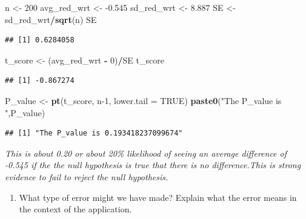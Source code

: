 \documentclass[]{article}
\newenvironment{Shaded}{\begin{snugshade}}{\end{snugshade}}
\newcommand{\DataTypeTok}[1]{\textcolor[rgb]{0.13,0.29,0.53}{#1}}
\newcommand{\DecValTok}[1]{\textcolor[rgb]{0.00,0.00,0.81}{#1}}
\newcommand{\FloatTok}[1]{\textcolor[rgb]{0.00,0.00,0.81}{#1}}
\newcommand{\KeywordTok}[1]{\textcolor[rgb]{0.13,0.29,0.53}{\textbf{#1}}}
\newcommand{\NormalTok}[1]{#1}
\newcommand{\OperatorTok}[1]{\textcolor[rgb]{0.81,0.36,0.00}{\textbf{#1}}}
\newcommand{\OtherTok}[1]{\textcolor[rgb]{0.56,0.35,0.01}{#1}}
\newcommand{\StringTok}[1]{\textcolor[rgb]{0.31,0.60,0.02}{#1}}
\providecommand{\tightlist}{%
  \setlength{\itemsep}{0pt}\setlength{\parskip}{0pt}}
\begin{document}
\begin{Shaded}
\begin{Highlighting}[]
\NormalTok{n <-}\StringTok{ }\DecValTok{200}
\NormalTok{avg_red_wrt <-}\StringTok{ }\FloatTok{-0.545}
\NormalTok{sd_red_wrt <-}\StringTok{ }\FloatTok{8.887}
\NormalTok{SE <-}\StringTok{ }\NormalTok{sd_red_wrt}\OperatorTok{/}\KeywordTok{sqrt}\NormalTok{(n)}
\NormalTok{SE}
\end{Highlighting}
\end{Shaded}

\begin{verbatim}
## [1] 0.6284058
\end{verbatim}

\begin{Shaded}
\begin{Highlighting}[]
\NormalTok{t_score <-}\StringTok{ }\NormalTok{(avg_red_wrt }\OperatorTok{-}\StringTok{ }\DecValTok{0}\NormalTok{)}\OperatorTok{/}\NormalTok{SE}
\NormalTok{t_score}
\end{Highlighting}
\end{Shaded}

\begin{verbatim}
## [1] -0.867274
\end{verbatim}

\begin{Shaded}
\begin{Highlighting}[]
\NormalTok{P_value <-}\StringTok{ }\KeywordTok{pt}\NormalTok{(t_score, n}\DecValTok{-1}\NormalTok{, }\DataTypeTok{lower.tail =} \OtherTok{TRUE}\NormalTok{)}
\KeywordTok{paste0}\NormalTok{(}\StringTok{"The P_value is "}\NormalTok{,P_value)}
\end{Highlighting}
\end{Shaded}

\begin{verbatim}
## [1] "The P_value is 0.193418237099674"
\end{verbatim}

\emph{This is about 0.20 or about 20\% likelihood of seeing an average
difference of -0.545 if the the null hypothesis is true that there is no
difference.This is strong evidence to fail to reject the null
hypothesis.}

\begin{enumerate}
\def\labelenumi{(\alph{enumi})}
\setcounter{enumi}{5}
\tightlist
\item
  What type of error might we have made? Explain what the error means in
  the context of the application.
\end{enumerate}
\end{document}

